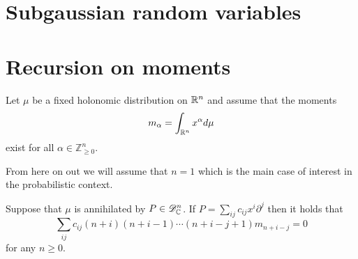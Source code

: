\section{Subgaussian random variables}\label{sec: SubGSubE}
\section{Recursion on moments}\label{sec: RecursionMoment}
Let $\mu$ be a fixed holonomic distribution on $\mathbb{R}^n$ and assume that the moments
$$m_\alpha = \int_{\mathbb{R}^n} x^\alpha d\mu$$
exist for all $\alpha \in \mathbb{Z}_{\geq 0}^n$.

From here on out we will assume that $n = 1$ which is the main case of interest in the probabilistic context.
\begin{proposition}
  Suppose that $\mu$ is annihilated by $P \in \mathscr{D}_{\mathbb{C}}^n$. If $P = \sum_{ij} c_{ij}x^i \partial^j$ then it holds that
  $$ \sum_{ij} c_{ij} (n+ i)(n+ i -1)\cdots (n+i-j + 1) m_{n + i - j} = 0$$
  for any $n \geq 0$.
\end{proposition}


